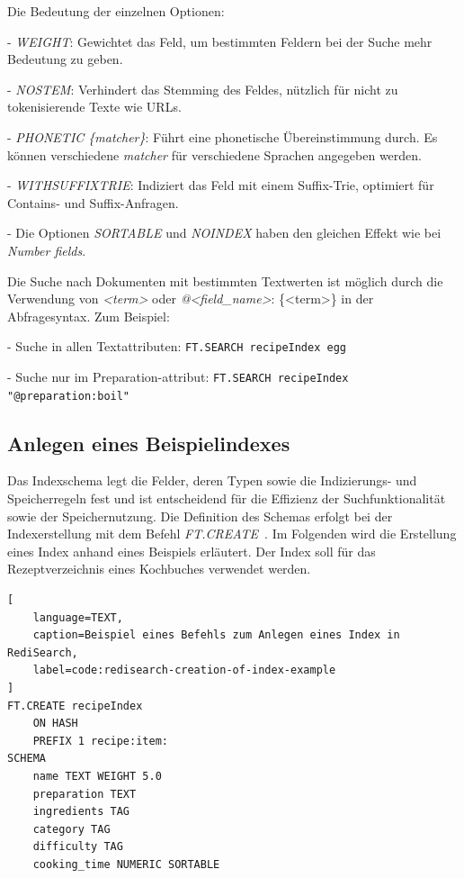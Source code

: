 Die Bedeutung der einzelnen Optionen:

- \emph{WEIGHT}: Gewichtet das Feld, um bestimmten Feldern bei der Suche mehr Bedeutung zu geben.

- \emph{NOSTEM}: Verhindert das Stemming des Feldes, nützlich für nicht zu tokenisierende Texte wie URLs.

- \emph{PHONETIC \{matcher\}}: Führt eine phonetische Übereinstimmung durch. Es können verschiedene \emph{matcher} für verschiedene Sprachen angegeben werden.

- \emph{WITHSUFFIXTRIE}: Indiziert das Feld mit einem Suffix-Trie, optimiert für Contains- und Suffix-Anfragen.

- Die Optionen \emph{SORTABLE} und \emph{NOINDEX} haben den gleichen Effekt wie bei \emph{Number fields}.

Die Suche nach Dokumenten mit bestimmten Textwerten ist möglich durch die Verwendung von \emph{<term>} oder \emph{@<field\_name>}:
\{<term>\} in der Abfragesyntax. Zum Beispiel:

- Suche in allen Textattributen:
 \texttt{FT.SEARCH recipeIndex \glqq egg\grqq}

- Suche nur im Preparation-attribut:
 \texttt{FT.SEARCH recipeIndex "@preparation:boil"}




\subsection{Anlegen eines Beispielindexes}
Das Indexschema legt die Felder, deren Typen sowie die Indizierungs- und Speicherregeln fest und ist entscheidend für die Effizienz der Suchfunktionalität sowie der Speichernutzung.
Die Definition des Schemas erfolgt bei der Indexerstellung mit dem Befehl \emph{FT.CREATE}~\cite{redis_ltd_ftcreate_nodate}.
Im Folgenden wird die Erstellung eines Index anhand eines Beispiels erläutert.
Der Index soll für das Rezeptverzeichnis eines Kochbuches verwendet werden.

\begin{lstlisting}[
    language=TEXT,
    caption=Beispiel eines Befehls zum Anlegen eines Index in RediSearch,
    label=code:redisearch-creation-of-index-example
]
FT.CREATE recipeIndex
    ON HASH
    PREFIX 1 recipe:item:
SCHEMA
    name TEXT WEIGHT 5.0
    preparation TEXT
    ingredients TAG
    category TAG
    difficulty TAG
    cooking_time NUMERIC SORTABLE
\end{lstlisting}

